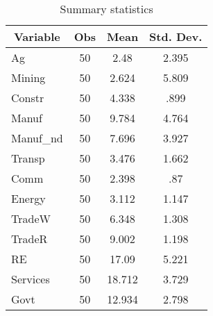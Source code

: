 \begin{table}[htbp]\centering \caption{Summary statistics\label{sumstat}}
\begin{tabular}{l c c c  }\hline\hline
\multicolumn{1}{c}{Variable} & Obs & Mean & Std. Dev.
   \\ \hline
Ag & 50 & 2.48 & 2.395   \\
Mining & 50 & 2.624 & 5.809   \\
Constr & 50 & 4.338 & .899   \\
Manuf & 50 & 9.784 & 4.764   \\
Manuf\_nd & 50 & 7.696 & 3.927   \\
Transp & 50 & 3.476 & 1.662   \\
Comm & 50 & 2.398 & .87   \\
Energy & 50 & 3.112 & 1.147   \\
TradeW & 50 & 6.348 & 1.308   \\
TradeR & 50 & 9.002 & 1.198   \\
RE & 50 & 17.09 & 5.221   \\
Services & 50 & 18.712 & 3.729   \\
Govt & 50 & 12.934 & 2.798   \\
\hline
\end{tabular}
\end{table}
